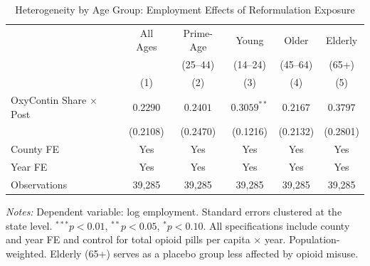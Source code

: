 \begin{table}[t]
\centering
\caption{Heterogeneity by Age Group: Employment Effects of Reformulation Exposure}
\label{tab:hetero}
\begin{threeparttable}
\begin{tabular}{lccccc}
\toprule
 & All Ages & Prime-Age & Young & Older & Elderly \\
 & & (25--44) & (14--24) & (45--64) & (65+) \\
 & (1) & (2) & (3) & (4) & (5) \\
\midrule
OxyContin Share $\times$ Post & $0.2290$ & $0.2401$ & $0.3059^{**}$ & $0.2167$ & $0.3797$ \\
 & (0.2108) & (0.2470) & (0.1216) & (0.2132) & (0.2801) \\
\midrule
County FE & Yes & Yes & Yes & Yes & Yes \\
Year FE & Yes & Yes & Yes & Yes & Yes \\
Observations & 39,285 & 39,285 & 39,285 & 39,285 & 39,285 \\
\bottomrule
\end{tabular}
\begin{tablenotes}[flushleft]
\footnotesize
\item \textit{Notes:} Dependent variable: log employment. Standard errors clustered at the state level. $^{***}p<0.01$, $^{**}p<0.05$, $^{*}p<0.10$. All specifications include county and year FE and control for total opioid pills per capita $\times$ year. Population-weighted. Elderly (65+) serves as a placebo group less affected by opioid misuse.
\end{tablenotes}
\end{threeparttable}
\end{table}

